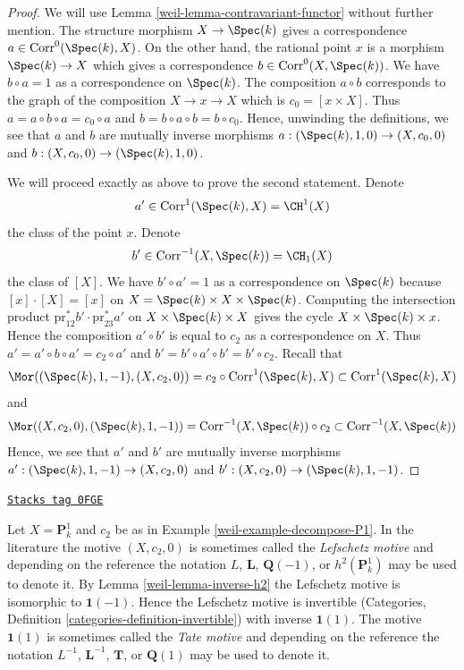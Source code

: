 \begin{proof}

We will use Lemma \ref{weil-lemma-contravariant-functor} without further mention.
The structure morphism $X \to \Spec(k)$ gives a correspondence
$a \in \text{Corr}^0(\Spec(k), X)$. On the other hand, the rational
point $x$ is a morphism $\Spec(k) \to X$ which gives a correspondence
$b \in \text{Corr}^0(X, \Spec(k))$. We have $b \circ a = 1$ as a
correspondence on $\Spec(k)$. The composition $a \circ b$ corresponds
to the graph of the composition $X \to x \to X$ which is
$c_0 = [x \times X]$. Thus $a = a \circ b \circ a = c_0 \circ a$
and $b = b \circ a \circ b = b \circ c_0$.
Hence, unwinding the definitions, we see that
$a$ and $b$ are mutually inverse morphisms
$a : (\Spec(k), 1, 0) \to (X, c_0, 0)$ and
$b : (X, c_0, 0) \to (\Spec(k), 1, 0)$.

\medskip\noindent
We will proceed exactly as above to prove the second statement.
Denote
$$
a' \in \text{Corr}^1(\Spec(k), X) = \CH^1(X)
$$
the class of the point $x$. Denote
$$
b' \in \text{Corr}^{-1}(X, \Spec(k)) = \CH_1(X)
$$
the class of $[X]$. We have $b' \circ a' = 1$ as a correspondence
on $\Spec(k)$ because $[x] \cdot [X] = [x]$ on
$X = \Spec(k) \times X \times \Spec(k)$. Computing the
intersection product $\text{pr}_{12}^*b' \cdot \text{pr}_{23}^*a'$
on $X \times \Spec(k) \times X$ gives the cycle
$X \times \Spec(k) \times x$. Hence
the composition $a' \circ b'$ is equal to $c_2$ as a
correspondence on $X$. Thus $a' = a' \circ b \circ a' = c_2 \circ a'$
and $b' = b' \circ a' \circ b' = b' \circ c_2$. Recall that
$$
\Mor((\Spec(k), 1, -1), (X, c_2, 0)) =
c_2 \circ \text{Corr}^1(\Spec(k), X)
\subset
\text{Corr}^1(\Spec(k), X)
$$
and
$$
\Mor((X, c_2, 0), (\Spec(k), 1, -1)) =
\text{Corr}^{-1}(X, \Spec(k)) \circ c_2
\subset
\text{Corr}^{-1}(X, \Spec(k))
$$
Hence, we see that $a'$ and $b'$ are mutually inverse morphisms
$a' : (\Spec(k), 1, -1) \to (X, c_2, 0)$ and
$b' : (X, c_2, 0) \to (\Spec(k), 1, -1)$.
\end{proof}

\begin{remark}

\label{weil-remark-lefschetz-tate}
\href{https://stacks.math.columbia.edu/tag/0FGE}{\texttt{Stacks tag 0FGE}}

Let $X = \mathbf{P}^1_k$ and $c_2$ be as in Example \ref{weil-example-decompose-P1}.
In the literature the motive $(X, c_2, 0)$ is sometimes called the
{\it Lefschetz motive} and depending on the reference the notation
$L$, $\mathbf{L}$, $\mathbf{Q}(-1)$, or $h^2(\mathbf{P}^1_k)$
may be used to denote it. By Lemma \ref{weil-lemma-inverse-h2} the Lefschetz motive
is isomorphic to $\mathbf{1}(-1)$. Hence the Lefschetz motive is
invertible (Categories, Definition \ref{categories-definition-invertible})
with inverse
$\mathbf{1}(1)$. The motive $\mathbf{1}(1)$ is sometimes called the
{\it Tate motive} and depending on the reference the notation
$L^{-1}$, $\mathbf{L}^{-1}$, $\mathbf{T}$, or $\mathbf{Q}(1)$ may
be used to denote it.
\end{remark}

